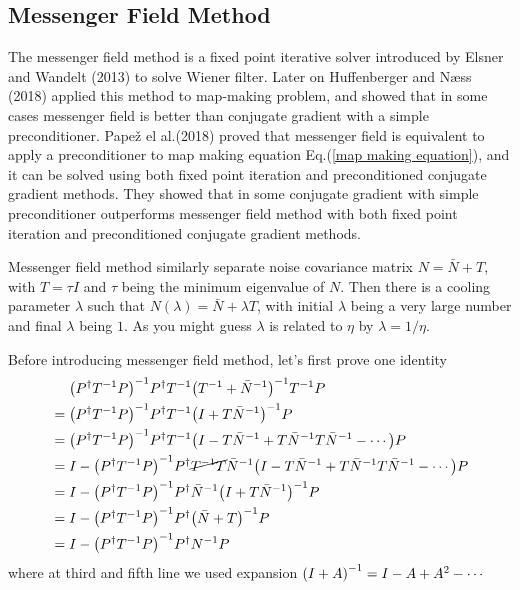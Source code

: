 \documentclass[11pt, letterpaper]{article}
\newcommand{\inv}[1]{#1^{-1}}
\newcommand{\Pdagger}{P^{\dagger}}
\newcommand{\Nbar}{\bar{N}}
\newcommand{\PPinv}[1]{\inv{\qty(\Pdagger #1 P)}}
\begin{document}
\subsection{Messenger Field Method}
The messenger field method is a fixed point iterative solver introduced by
Elsner and Wandelt (2013) \cite{2013A&A...549A.111E} to solve Wiener filter.
Later on Huffenberger and N{\ae}ss (2018) \cite{Huffenberger_2018} applied this
method to map-making problem, and showed that in some cases messenger field is
better than conjugate gradient with a simple preconditioner.
 Pape\v{z} el al.(2018) \cite{2018A&A...620A..59P} proved that messenger
field is equivalent to apply a preconditioner to map making equation
Eq.(\ref{map making equation}), and it can be solved using both fixed point
iteration and preconditioned conjugate gradient methods.
They showed that in some conjugate gradient with simple preconditioner
outperforms messenger field method with both fixed point iteration and
preconditioned conjugate gradient methods.

Messenger field method similarly separate noise covariance matrix
$N = \Nbar + T$, with $T = \tau I $ and $\tau$ being the minimum eigenvalue of
$N$.
Then there is a cooling parameter $\lambda$ such that 
$N(\lambda) = \Nbar + \lambda T$, with initial $\lambda$ being a very large
number and final $\lambda$ being $1$.
As you might guess $\lambda$ is related to $\eta$ by $\lambda = 1/\eta$.

Before introducing messenger field method, let's first prove one identity
\begin{align}
\begin{aligned}[b]
&\mathrel{\phantom{=}}
\PPinv{\inv{T}} \Pdagger \inv{T} \inv{\qty(\inv{T} + \inv{\Nbar})} \inv{T} P
\\
&= \PPinv{\inv{T}} \Pdagger \inv{T} \inv{\qty(I + T\inv{\Nbar})}  P
\\
&= \PPinv{\inv{T}} \Pdagger \inv{T}
    \qty(I - T\inv{\Nbar}+ T\inv{\Nbar}T\inv{\Nbar} - \cdots) P
\\
&= I - \PPinv{\inv{T}} \Pdagger \cancel{\inv{T}T} \inv{\Nbar} 
    \qty(I - T\inv{\Nbar} + T\inv{\Nbar}T\inv{\Nbar} - \cdots)P
\\
&= I - \PPinv{\inv{T}} \Pdagger \inv{\Nbar} \inv{\qty(I + T\inv{\Nbar})} P
\\
&= I - \PPinv{\inv{T}} \Pdagger \inv{\qty(\Nbar + T)} P
\\
&= I - \PPinv{\inv{T}} \Pdagger \inv{N} P \label{MF identity}
\end{aligned}
\end{align}
where at third and fifth line we used expansion
$\inv{\qty(I + A)} = I - A + A^2 - \cdots $
\end{document}
